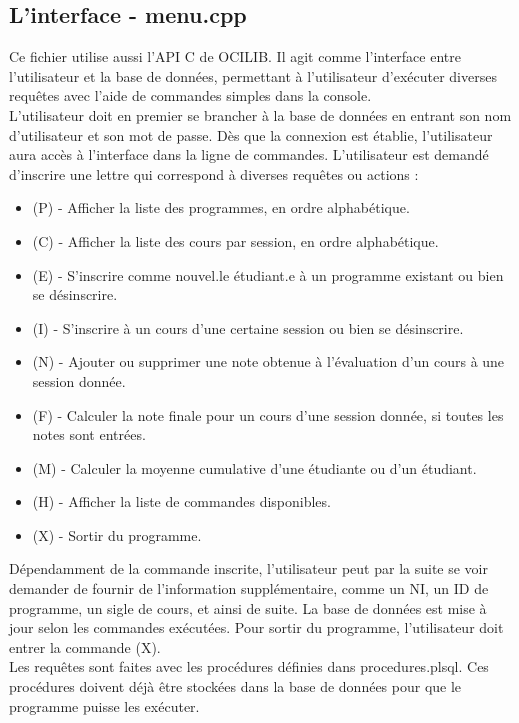 \documentclass[a4paper,12pt]{article}
\begin{document}
\subsection{L'interface - menu.cpp}
\indent Ce fichier utilise aussi l'API C de OCILIB. Il agit comme l'interface entre l'utilisateur et la base de données, permettant
à l'utilisateur d'exécuter diverses requêtes avec l'aide de commandes simples dans la console. \\
\indent L'utilisateur doit en premier se brancher à la base de données en entrant son nom d'utilisateur et son mot de passe.
Dès que la connexion est établie, l'utilisateur aura accès à l'interface dans la ligne de commandes. L'utilisateur est demandé d'inscrire
une lettre qui correspond à diverses requêtes ou actions :
\begin{itemize}
    \item (P) - Afficher la liste des programmes, en ordre alphabétique.
    \item (C) - Afficher la liste des cours par session, en ordre alphabétique.
    \item (E) - S'inscrire comme nouvel.le étudiant.e à un programme existant ou bien se désinscrire.
    \item (I) - S'inscrire à un cours d'une certaine session ou bien se désinscrire.
    \item (N) - Ajouter ou supprimer une note obtenue à l'évaluation d'un cours à une session donnée.
    \item (F) - Calculer la note finale pour un cours d'une session donnée, si toutes les notes sont entrées.
    \item (M) - Calculer la moyenne cumulative d'une étudiante ou d'un étudiant.
    \item (H) - Afficher la liste de commandes disponibles.
    \item (X) - Sortir du programme.
\end{itemize}
\indent Dépendamment de la commande inscrite, l'utilisateur peut par la suite se voir demander de fournir de l'information supplémentaire,
comme un NI, un ID de programme, un sigle de cours, et ainsi de suite. La base de données est mise à jour selon les commandes exécutées.
Pour sortir du programme, l'utilisateur doit entrer la commande (X). \\
\indent Les requêtes sont faites avec les procédures définies dans procedures.plsql. Ces procédures doivent déjà être stockées dans la base de données
pour que le programme puisse les exécuter.
\end{document}
